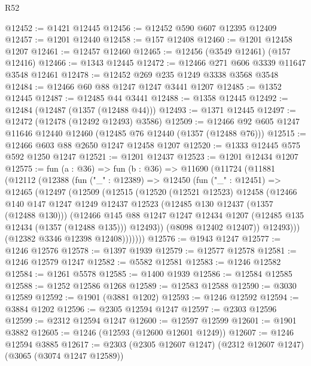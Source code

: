 \begin{lexlean}{R52}
\begin{coremodule}
@12452 := @1421 @12445
@12456 := @12452 @590 @607 @12395 @12409
@12457 := @1201 @12440
@12458 := @157 @12408
@12460 := @1201 @12458 @1207
@12461 := @12457 @12460
@12465 := @12456 (@3549 @12461) (@157 @12416)
@12466 := @1343 @12445
@12472 := @12466 @271 @606 @3339 @11647 @3548 @12461
@12478 := @12452 @269 @235 @1249 @3338 @3568 @3548
@12484 := @12466 @60 @88 @1247 @1247 @3441 @1207
@12485 := @1352 @12445
@12487 := @12485 @44 @3441
@12488 := @1358 @12445
@12492 := @12484 (@12487 (@1357 (@12488 @44)))
@12493 := @1371 @12445
@12497 := @12472 (@12478 (@12492 @12493) @3586)
@12509 := @12466 @92 @605 @1247 @11646 @12440 @12460 (@12485 @76 @12440 (@1357 (@12488 @76)))
@12515 := @12466 @603 @88 @2650 @1247 @12458 @1207
@12520 := @1333 @12445 @575 @592 @1250 @1247
@12521 := @1201 @12437
@12523 := @1201 @12434 @1207
@12575 := fun (a : @36) =>
  fun (b : @36) =>
  @11690
    (@11724
      (@11881
        (@12112
          (@12388
            (fun ("_" : @12389) =>
            @12450
              (fun ("_" : @12451) =>
              @12465
                (@12497
                  (@12509
                    (@12515
                      (@12520
                        (@12521 @12523)
                        @12458
                        (@12466
                          @140
                          @147
                          @1247
                          @1249
                          @12437
                          @12523
                          (@12485 @130 @12437 (@1357 (@12488 @130)))
                          (@12466
                            @145
                            @88
                            @1247
                            @1247
                            @12434
                            @1207
                            (@12485 @135 @12434 (@1357 (@12488 @135)))
                            @12493))
                        (@8098 @12402 @12407))
                      @12493)))
                (@12382 @3346 @12398 @12408)))))))
@12576 := @1943 @1247
@12577 := @1246 @12576
@12578 := @1397 @1939
@12579 := @12577 @12578
@12581 := @1246 @12579 @1247
@12582 := @5582 @12581
@12583 := @1246 @12582
@12584 := @1261 @5578
@12585 := @1400 @1939
@12586 := @12584 @12585
@12588 := @1252 @12586 @1268
@12589 := @12583 @12588
@12590 := @3030 @12589
@12592 := @1901 (@3881 @1202)
@12593 := @1246 @12592
@12594 := @3884 @1202
@12596 := @2305 @12594 @1247
@12597 := @2303 @12596
@12599 := @2312 @12594 @1247
@12600 := @12597 @12599
@12601 := @1901 @3882
@12605 := @1246 (@12593 (@12600 @12601 @1249))
@12607 := @1246 @12594 @3885
@12617 := @2303 (@2305 @12607 @1247) (@2312 @12607 @1247) (@3065 (@3074 @1247 @12589))

\end{coremodule}
\end{lexlean}

